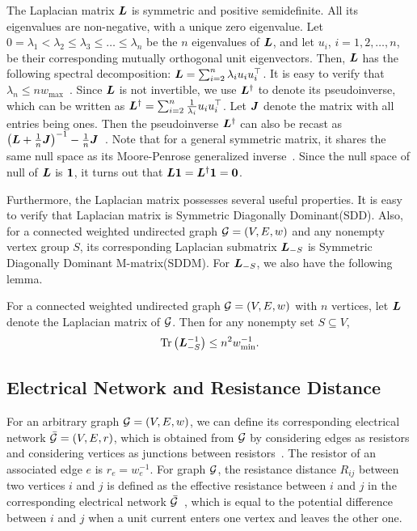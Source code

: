 \documentclass[10pt,journal,compsoc,twocolumn,twoside]{IEEEtran}
\begin{document}
The Laplacian matrix \(\boldsymbol{L}\) is symmetric and positive semidefinite. All  its eigenvalues  are non-negative, with a unique zero eigenvalue. Let \(0=\lambda_1< \lambda_2 \leq \lambda_3\leq \dots\leq \lambda_{n}\) be the \(n\) eigenvalues of  \(\boldsymbol{L}\), and let \(u_i\), \( i={1,2,\dots,n}\), be their corresponding mutually orthogonal  unit eigenvectors. Then, \(\boldsymbol{L}\) has the following spectral decomposition:  \(\boldsymbol{L}=\sum_{i=2}^{n}\lambda_i u_iu_i^\top\).  It is easy to verify that \( \lambda_{n}\leq n w_{\max}\)~\cite{LiSc18}.
Since \(\boldsymbol{L}\) is not invertible, we use \(\boldsymbol{L}^{\dagger}\) to denote its pseudoinverse, which can be written as \(\boldsymbol{L}^{\dagger}=\sum_{i=2}^{n}\frac{1}{\lambda_i}u_iu_i^{\top}\). Let \(\boldsymbol{J}\) denote the matrix with all entries being ones. Then the pseudoinverse \(\boldsymbol{L}^{\dagger}\) can also be recast as \(\left( \boldsymbol{L} +\frac{1}{n}\boldsymbol{J} \right)^{-1} - \frac{1}{n}\boldsymbol{J}\)~\cite{GhBoSa08}. Note that for a general symmetric matrix, it shares the same null space as its Moore-Penrose generalized inverse~\cite{BeGrTh74}.
Since the  null space of  null of \({\boldsymbol{L}}\) is \( \boldsymbol{1}\),  it turns out that \({\boldsymbol{L}} \boldsymbol{1} ={\boldsymbol{L}}^{\dagger} \boldsymbol{1} =\mathbf{0}\).

Furthermore, the Laplacian matrix possesses several useful properties.
It is easy to verify that Laplacian matrix is Symmetric Diagonally Dominant(SDD).
Also, for a connected weighted undirected graph \(\mathcal{G}=(V,E,w)\) and any nonempty vertex group \(S\), its corresponding Laplacian submatrix \(\boldsymbol{L}_{-S}\) is Symmetric Diagonally Dominant M-matrix(SDDM).
For \(\boldsymbol{L}_{-S}\), we also have the following lemma.
\begin{lemma}\label{lem:trace-lap}
    For a connected weighted undirected graph \(\mathcal{G}=(V,E,w)\) with \(n\) vertices, let \(\boldsymbol{L}\) denote the Laplacian matrix of \(\mathcal{G}\).
    Then for any nonempty set \(S\subseteq V\),
    \begin{equation*}
        \mathrm{Tr}\left(\boldsymbol{L}_{-S}^{-1}\right)\le n^2w_{\min}^{-1}.
    \end{equation*}
\end{lemma}

\subsection{Electrical Network and Resistance Distance}

For an arbitrary graph \(\mathcal{G}=(V,E,w)\), we can define its corresponding electrical network \(\bar{\mathcal{G}}=(V,E,r)\), which is obtained from \(\mathcal{G}\)  by considering edges as resistors and considering vertices as junctions between resistors~\cite{DoSn84}. The resistor of an associated  edge \(e\) is \(r_e=w_e^{-1}\).  For graph  \(\mathcal{G}\), the resistance distance \(R_{ij}\) between two vertices \(i\) and \(j\)  is defined as the effective resistance between \(i\) and \(j\) in the corresponding  electrical network \(\bar{\mathcal{G}}\)~\cite{KlRa93}, which is equal to the potential difference between \(i\) and \(j\) when a unit current enters one vertex and leaves the other one.
\end{document}
